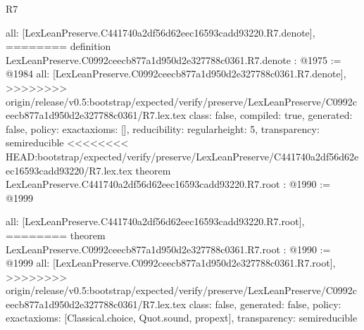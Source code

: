 \begin{lexlean}{R7}
\begin{coremodule}
{{{{{{{{{{{{  all: [LexLeanPreserve.C441740a2df56d62eec16593cadd93220.R7.denote],
========
definition LexLeanPreserve.C0992ceecb877a1d950d2e327788c0361.R7.denote : @1975 := @1984 {
  all: [LexLeanPreserve.C0992ceecb877a1d950d2e327788c0361.R7.denote],
>>>>>>>> origin/release/v0.5:bootstrap/expected/verify/preserve/LexLeanPreserve/C0992ceecb877a1d950d2e327788c0361/R7.lex.tex
  class: false,
  compiled: true,
  generated: false,
  policy: exact{axioms: []},
  reducibility: regular{height: 5},
  transparency: semireducible
}
<<<<<<<< HEAD:bootstrap/expected/verify/preserve/LexLeanPreserve/C441740a2df56d62eec16593cadd93220/R7.lex.tex
theorem LexLeanPreserve.C441740a2df56d62eec16593cadd93220.R7.root : @1990 := @1999 {
  all: [LexLeanPreserve.C441740a2df56d62eec16593cadd93220.R7.root],
========
theorem LexLeanPreserve.C0992ceecb877a1d950d2e327788c0361.R7.root : @1990 := @1999 {
  all: [LexLeanPreserve.C0992ceecb877a1d950d2e327788c0361.R7.root],
>>>>>>>> origin/release/v0.5:bootstrap/expected/verify/preserve/LexLeanPreserve/C0992ceecb877a1d950d2e327788c0361/R7.lex.tex
  class: false,
  generated: false,
  policy: exact{axioms: [Classical.choice, Quot.sound, propext]},
  transparency: semireducible
}

}}}}}}}}}}}}}
\end{coremodule}
\end{lexlean}
